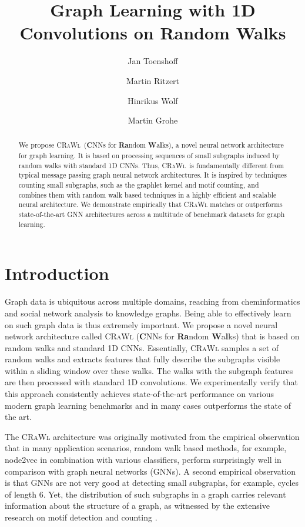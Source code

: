 \documentclass{scrartcl} \usepackage[dvipsnames]{xcolor}
\title{Graph Learning with 1D Convolutions on Random Walks}
\author{Jan Toenshoff \and Martin Ritzert \and Hinrikus Wolf \and Martin Grohe}
\date{}
\newcommand{\crawl}{\textsc{CRaWl}}
\begin{document}
    \maketitle
    

\begin{abstract}
    We propose \crawl\ (\textbf{C}NNs for \textbf{Ra}ndom \textbf{W}a\textbf{l}ks), a novel neural network architecture for graph learning.
    It is based on processing sequences of small subgraphs induced by random walks with standard 1D CNNs.
    Thus, \crawl\ is fundamentally different from typical message passing graph neural network architectures. 
    It is inspired by techniques counting small subgraphs, such as the graphlet kernel and motif counting, and combines them with random walk based techniques in a highly efficient and scalable neural architecture.
    We demonstrate empirically that \crawl{} matches or outperforms state-of-the-art GNN architectures across a multitude of benchmark datasets for graph learning. 
\end{abstract}




    \section{Introduction}
\label{introduction}

Graph data is ubiquitous across multiple domains, reaching from cheminformatics and social network analysis to \mbox{knowledge} graphs.
Being able to effectively learn on such graph data is thus extremely important.
We propose a novel neural network architecture called \crawl{} (\textbf{C}NNs for \textbf{Ra}ndom \textbf{W}a\textbf{l}ks) that is based on random walks and standard 1D CNNs.
Essentially, \crawl{} samples a set of random walks and extracts features that fully describe the subgraphs visible within a sliding window over these walks. 
The walks with the subgraph features are then processed with standard 1D convolutions. 
We experimentally verify that this approach consistently achieves state-of-the-art performance on various modern graph learning benchmarks and in many cases outperforms the state of the art.

The \crawl{} architecture was originally motivated from the empirical observation that in many application scenarios, random walk based methods, for example, node2vec \cite{DBLP:conf/kdd/GroverL16} in combination with various classifiers, perform surprisingly well in comparison with graph neural networks (GNNs). 
A second empirical observation is that GNNs are not very good at detecting small subgraphs, for example, cycles of length 6.
Yet, the distribution of such subgraphs in a graph carries relevant information about the structure of a graph, as witnessed by the extensive research on motif detection and counting \citep[e.g.][]{alo07}. 
\end{document}

